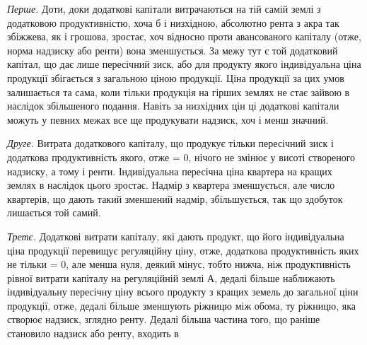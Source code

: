 \emph{Перше.} Доти, доки додаткові капітали витрачаються на тій самій землі
з додатковою продуктивністю, хоча б і низхідною, абсолютно рента з акра
так збіжжева, як і грошова, зростає, хоч відносно проти авансованого капіталу
(отже, норма надзиску або ренти) вона зменшується. За межу тут є той додатковий
капітал, що дає лише пересічний зиск, або для продукту якого індивідуальна
ціна продукції збігається з загальною ціною продукції. Ціна продукції
за цих умов залишається та сама, коли тільки продукція на гірших землях
не стає зайвою в наслідок збільшеного подання. Навіть за низхідних цін ці
додаткові капітали можуть у певних межах все ще продукувати надзиск, хоч
і менш значний.

\emph{Друге.} Витрата додаткового капіталу, що продукує тільки пересічний
зиск і додаткова продуктивність якого, отже = 0, нічого не змінює у висоті
створеного надзиску, а тому і ренти. Індивідуальна пересічна ціна квартера на
кращих землях в наслідок цього зростає. Надмір з квартера зменшується, але
число квартерів, що дають такий зменшений надмір, збільшується, так що здобуток
лишається той самий.

\emph{Третє.} Додаткові витрати капіталу, які дають продукт, що його індивідуальна
ціна продукції перевищує регуляційну ціну, отже, додаткова продуктивність
яких не тільки = 0, але менша нуля, деякий мінус, тобто нижча,
ніж продуктивність рівної витрати капіталу на регуляційній землі $А$, дедалі
більше наближають індивідуальну пересічну ціну всього продукту з кращих
земель до загальної ціни продукції, отже, дедалі більше зменшують ріжницю
між обома, ту ріжницю, яка створює надзиск, зглядно ренту. Дедалі
більша частина того, що раніше становило надзиск або ренту, входить в
\parbreak{}  %
